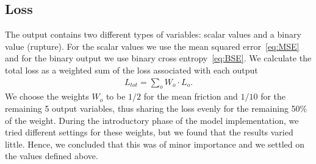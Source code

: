 \subsection{Loss}\label{sec:loss}
The output contains two different types of variables: scalar values and a binary value (rupture). For the scalar values we use the mean squared error~\cref{eq:MSE} and for the binary output we use binary cross entropy~\cref{eq:BSE}. We calculate the total loss as a weighted sum of the loss associated with
each output
\begin{align*}
  L_{tot} = \sum_{o} W_o\cdot L_o.
\end{align*}
We choose the weights $W_o$ to be $1/2$ for the mean friction and $1/10$ for the
remaining 5 output variables, thus sharing the loss evenly for the remaining 50\% of the weight. During the introductory phase of the model implementation, we tried different settings for these weights, but we found that the results varied little. Hence, we concluded that this was of minor importance and we settled on the values defined above.

